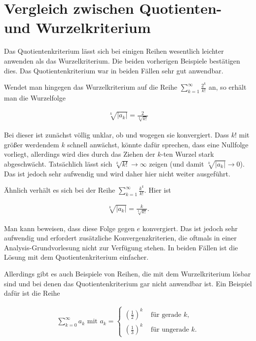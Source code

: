\documentclass[fontsize=9pt,
               parskip=half-,
               DIV=14,
               listof=chapterentry,
               tocflat]{scrbook}
\begin{document}
\section{Vergleich zwischen Quotienten- und Wurzelkriterium}

Das Quotientenkriterium lässt sich bei einigen Reihen wesentlich leichter anwenden als das Wurzelkriterium. Die beiden vorherigen Beispiele bestätigen dies. Das Quotientenkriterium war in beiden Fällen sehr gut anwendbar.

Wendet man hingegen das Wurzelkriterium auf die Reihe $\sum _{k=1}^{\infty }{\frac {2^{k}}{k!}}$ an, so erhält man die Wurzelfolge

\begin{align*}
{\sqrt[{k}]{|a_{k}|}}={\frac {2}{\sqrt[{k}]{k!}}}
\end{align*}

Bei dieser ist zunächst völlig unklar, ob und wogegen sie konvergiert. Dass $k!$ mit größer werdendem $k$ schnell anwächst, könnte dafür sprechen, dass eine Nullfolge vorliegt, allerdings wird dies durch das Ziehen der $k$-ten Wurzel stark abgeschwächt. Tatsächlich lässt sich ${\sqrt[{k}]{k!}}\to \infty $ zeigen (und damit ${\sqrt[{k}]{|a_{k}|}}\to 0$). Das ist jedoch sehr aufwendig und wird daher hier nicht weiter ausgeführt.

Ähnlich verhält es sich bei der Reihe $\sum _{k=1}^{\infty }{\frac {k^{k}}{k!}}$. Hier ist

\begin{align*}
{\sqrt[{k}]{|a_{k}|}}={\frac {k}{\sqrt[{k}]{k!}}}.
\end{align*}

Man kann beweisen, dass diese Folge gegen $e$ konvergiert. Das ist jedoch sehr aufwendig und erfordert zusätzliche Konvergenzkriterien, die oftmals in einer Analysis-Grundvorlesung nicht zur Verfügung stehen. In beiden Fällen ist die Lösung mit dem Quotientenkriterium einfacher.

Allerdings gibt es auch Beispiele von Reihen, die mit dem Wurzelkriterium lösbar sind und bei denen das Quotientenkriterium gar nicht anwendbar ist. Ein Beispiel dafür ist die Reihe

\begin{align*}
\sum _{k=0}^{\infty }a_{k}{\text{ mit }}a_{k}={\begin{cases}\left({\frac {1}{2}}\right)^{k}&{\text{ für gerade }}k,\\\left({\frac {1}{3}}\right)^{k}&{\text{ für ungerade }}k.\end{cases}}
\end{align*}
\end{document}
